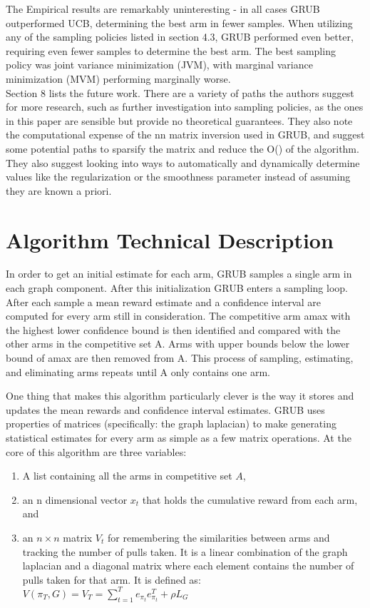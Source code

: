 \documentclass{article}[12pt]
\begin{document}
The Empirical results are remarkably uninteresting - in all cases GRUB outperformed UCB, determining the best arm in fewer samples.
When utilizing any of the sampling policies listed in section 4.3, GRUB performed even better, requiring even fewer samples to determine the best arm.
The best sampling policy was joint variance minimization (JVM), with marginal variance minimization (MVM) performing marginally worse. \\

Section 8 lists the future work.
There are a variety of paths the authors suggest for more research,
such as further investigation into sampling policies,
as the ones in this paper are sensible but provide no theoretical guarantees.
They also note the computational expense of the nn matrix inversion used in GRUB,
and suggest some potential paths to sparsify the matrix and reduce the O() of the algorithm.
They also suggest looking into ways to automatically and dynamically determine values like the regularization or the smoothness parameter instead of assuming they are known a priori. \\

\pagebreak

\section{Algorithm Technical Description}

In order to get an initial estimate for each arm, GRUB samples a single arm in each graph component.
After this initialization GRUB enters a sampling loop.
After each sample a mean reward estimate and a confidence interval are computed for every arm still in consideration.
The competitive arm amax with the highest lower confidence bound is then identified and compared with the other arms in the competitive set A.
Arms with upper bounds below the lower bound of amax are then removed from A.
This process of sampling, estimating, and eliminating arms repeats until A only contains one arm.


One thing that makes this algorithm particularly clever is the way it stores and updates the mean rewards and confidence interval estimates.
GRUB uses properties of matrices (specifically: the graph laplacian) to make generating statistical estimates for every arm as simple as a few matrix operations.
At the core of this algorithm are three variables:
\begin{enumerate}
    \item A list containing all the arms in competitive set $A$,
    \item an n dimensional vector $x_t$ that holds the cumulative reward from each arm, and
    \item an $n \times n$ matrix $V_t$ for remembering the similarities between arms and tracking the number of pulls taken.
    It is a linear combination of the graph laplacian and a diagonal matrix where each element contains the number of pulls taken for that arm.
        It is defined as: $ V(\pi_T, G) = V_T = \sum_{t=1}^T e_{\pi_t} e_{\pi_t}^T + \rho L_G $
 		
\end{enumerate}
\end{document}
